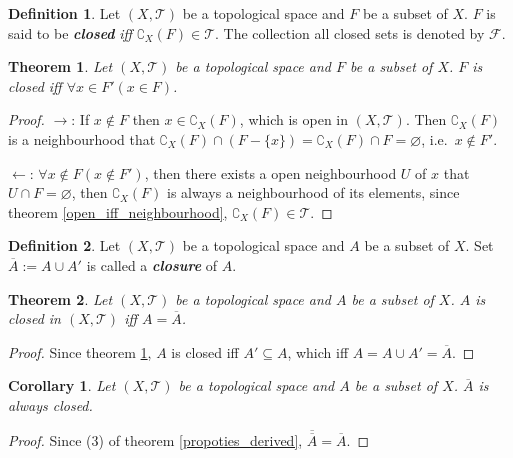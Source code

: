 \documentclass{article}%
\theoremstyle{plain}
\newtheorem{theorem}{Theorem}[section] %
\newtheorem{corollary}{Corollary} %
\theoremstyle{definition}
\newtheorem{definition}{Definition}[section] %
\newcommand*{\indexbf}[1]{\textit{\textbf{#1}}\index{#1}}
\begin{document}
\begin{definition}\label{closed_set}
Let $(X,\mathscr T)$ be a topological space and $F$ be a subset of $X$. $F$ is said to be \indexbf{closed} \emph{iff} $\complement_X (F) \in \mathscr T$. The collection all closed sets is denoted by $\mathscr F$.
\end{definition}

\begin{theorem}\label{closed_iff_accumulation}
Let $(X,\mathscr T)$ be a topological space and $F$ be a subset of $X$. $F$ is closed \emph{iff} $\forall x\in F' (x\in F)$.
\end{theorem}
\begin{proof}
$\to$: 
If $x\notin F$ then $x\in \complement_X (F)$, which is open in $(X,\mathscr T)$. 
Then $\complement_X (F)$ is a neighbourhood that $\complement_X (F) \cap (F-\{x\}) = \complement_X (F) \cap F =\varnothing$, i.e.\ $x\notin F'$.

$\leftarrow$:
$\forall x\notin F(x\notin F')$, then there exists a open neighbourhood $U$ of $x$ that $U\cap F = \varnothing$, then $\complement_X (F)$ is always a neighbourhood of its elements, since theorem \ref{open_iff_neighbourhood}, $\complement_X (F) \in \mathscr T$.
\end{proof}

\begin{definition}\label{closure}
Let $(X,\mathscr T)$ be a topological space and $A$ be a subset of $X$. Set $\overline A := A\cup A'$ is called a \indexbf{closure} of $A$.
\end{definition}

\begin{theorem}\label{closed_iff_closure}
Let $(X,\mathscr T)$ be a topological space and $A$ be a subset of $X$. 
$A$ is closed in $(X,\mathscr T)$ \emph{iff} $A=\overline A$.
\end{theorem}
\begin{proof}
Since theorem \ref{closed_iff_accumulation}, $A$ is closed iff $A'\subseteq A$, which iff $A = A\cup A' = \overline A$.
\end{proof}

\begin{corollary}\label{closure_closed}
Let $(X,\mathscr T)$ be a topological space and $A$ be a subset of $X$. 
$\overline A$ is always closed.
\end{corollary}
\begin{proof}
Since (3) of theorem \ref{propoties_derived}, $\overline{\overline A} = \overline A$.
\end{proof}
\end{document}
